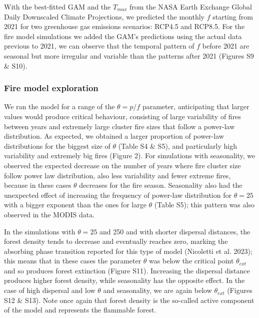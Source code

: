 \documentclass[
]{article}
\begin{document}
With the best-fitted GAM and the \(T_{max}\) from the NASA Earth
Exchange Global Daily Downscaled Climate Projections, we predicted the
monthly \(f\) starting from 2021 for two greenhouse gas emissions
scenarios: RCP4.5 and RCP8.5. For the fire model simulations we added
the GAM's predictions using the actual data previous to 2021, we can
observe that the temporal pattern of \(f\) before 2021 are seasonal but
more irregular and variable than the patterns after 2021 (Figures S9 \&
S10).

\subsubsection{Fire model exploration}\label{fire-model-exploration}

We ran the model for a range of the \(\theta = p/f\) parameter,
anticipating that larger values would produce critical behaviour,
consisting of large variability of fires between years and extremely
large cluster fire sizes that follow a power-law distribution. As
expected, we obtained a larger proportion of power-law distributions for
the biggest size of \(\theta\) (Table S4 \& S5), and particularly high
variability and extremely big fires (Figure 2). For simulations with
seasonality, we observed the expected decrease on the number of years
where fire cluster size follow power law distribution, also less
variability and fewer extreme fires, because in these cases \(\theta\)
decreases for the fire season. Seasonality also had the unexpected
effect of increasing the frequency of power-law distribution for
\(\theta = 25\) with a bigger exponent than the ones for large
\(\theta\) (Table S5); this pattern was also observed in the MODIS data.

In the simulations with \(\theta = 25\) and 250 and with shorter
dispersal distances, the forest density tends to decrease and eventually
reaches zero, marking the absorbing phase transition reported for this
type of model (Nicoletti et al. 2023); this means that in these cases
the parameter \(\theta\) was below the critical point \(\theta_{ext}\)
and so produces forest extinction (Figure S11). Increasing the dispersal
distance produces higher forest density, while seasonality has the
opposite effect. In the case of high dispersal and low \(\theta\) and
seasonality, we are again below \(\theta_{ext}\) (Figures S12 \& S13).
Note once again that forest density is the so-called active component of
the model and represents the flammable forest.
\end{document}
